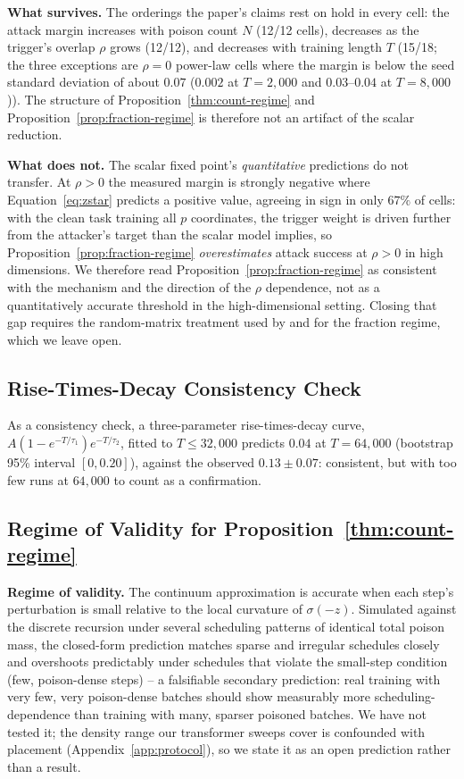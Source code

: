 \documentclass{article} %
\begin{document}
\textbf{What survives.} The orderings the paper's claims rest on hold in every cell:
the attack margin increases with poison count $N$ (12/12 cells), decreases as the
trigger's overlap $\rho$ grows (12/12), and decreases with training length $T$ (15/18;
the three exceptions are $\rho=0$ power-law cells where the margin is below the seed standard deviation of about $0.07$ ($0.002$ at $T=2{,}000$ and $0.03$--$0.04$ at $T=8{,}000$)). The structure of Proposition~\ref{thm:count-regime} and
Proposition~\ref{prop:fraction-regime} is therefore not an artifact of the scalar
reduction.

\textbf{What does not.} The scalar fixed point's \emph{quantitative} predictions do not
transfer. At $\rho>0$ the measured margin is strongly negative where
Equation~\ref{eq:zstar} predicts a positive value, agreeing in sign in only $67\%$ of
cells: with the clean task training all $p$ coordinates, the trigger weight is driven
further from the attacker's target than the scalar model implies, so
Proposition~\ref{prop:fraction-regime} \emph{overestimates} attack success at $\rho>0$
in high dimensions. We therefore read Proposition~\ref{prop:fraction-regime} as consistent with the mechanism and the direction of the $\rho$ dependence, not as a quantitatively accurate threshold in the high-dimensional setting. Closing that gap
requires the random-matrix treatment used by \citet{linearpoisoning2025} and
\citet{glmbackdoor2026} for the fraction regime, which we leave open.

\subsection{Rise-Times-Decay Consistency Check}
\label{app:fit}

As a
consistency check, a three-parameter rise-times-decay curve,
$A(1-e^{-T/\tau_1})e^{-T/\tau_2}$, fitted to $T\leq32{,}000$
predicts $0.04$ at $T=64{,}000$ (bootstrap 95\% interval $[0,0.20]$), against the
observed $0.13\pm0.07$: consistent, but with too few runs at $64{,}000$ to count as a
confirmation.

\subsection{Regime of Validity for Proposition~\ref{thm:count-regime}}
\label{app:validity}

\textbf{Regime of validity.} The continuum approximation is accurate when each step's
perturbation is small relative to the local curvature of $\sigma(-z)$. Simulated
against the discrete recursion under several scheduling patterns of identical total poison mass, the closed-form prediction matches sparse and irregular schedules closely and
overshoots predictably under schedules that violate the small-step condition (few,
poison-dense steps) -- a falsifiable secondary prediction: real training with very few, very
poison-dense batches should show measurably more scheduling-dependence than training
with many, sparser poisoned batches. We have not tested it; the density range our
transformer sweeps cover is confounded with placement (Appendix~\ref{app:protocol}), so
we state it as an open prediction rather than a result.
\end{document}

